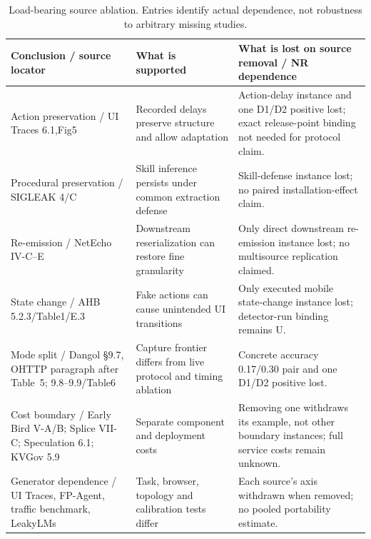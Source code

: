 \begin{table}[t]\centering\footnotesize
\caption{Load-bearing source ablation. Entries identify actual dependence, not robustness to arbitrary missing studies.}\label{tab:source-dependencies}
\begin{tabularx}{\textwidth}{@{}p{}YY@{}}\toprule
Conclusion / source locator & What is supported & What is lost on source removal / NR dependence\\\midrule
Action preservation / UI Traces 6.1,Fig5 & Recorded delays preserve structure and allow adaptation & Action-delay instance and one D1/D2 positive lost; exact release-point binding not needed for protocol claim.\\
Procedural preservation / SIGLEAK 4/C & Skill inference persists under common extraction defense & Skill-defense instance lost; no paired installation-effect claim.\\
Re-emission / NetEcho IV-C--E & Downstream reserialization can restore fine granularity & Only direct downstream re-emission instance lost; no multisource replication claimed.\\
State change / AHB 5.2.3/Table1/E.3 & Fake actions can cause unintended UI transitions & Only executed mobile state-change instance lost; detector-run binding remains U.\\
Mode split / Dangol \S9.7, OHTTP paragraph after Table~5; 9.8--9.9/Table6 & Capture frontier differs from live protocol and timing ablation & Concrete accuracy 0.17/0.30 pair and one D1/D2 positive lost.\\
Cost boundary / Early Bird V-A/B; Splice VII-C; Speculation 6.1; KVGov 5.9 & Separate component and deployment costs & Removing one withdraws its example, not other boundary instances; full service costs remain unknown.\\
Generator dependence / UI Traces, FP-Agent, traffic benchmark, LeakyLMs & Task, browser, topology and calibration tests differ & Each source's axis withdrawn when removed; no pooled portability estimate.\\\bottomrule
\end{tabularx}\end{table}
